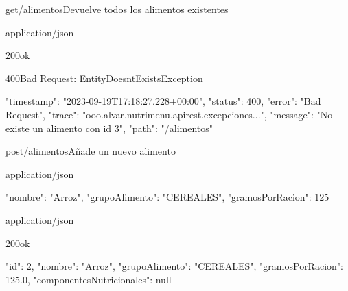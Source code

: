 \begin{apiRoute}{get}{/alimentos}{Devuelve todos los alimentos existentes}
	
	\begin{routeParameter}
	\end{routeParameter}
	
	\begin{routeResponse}{application/json}
		\begin{routeResponseItem}{200}{ok}
			\begin{routeResponseItemBody}
			\end{routeResponseItemBody}
		\end{routeResponseItem}
		\begin{routeResponseItem}{400}{Bad Request: EntityDoesntExistsException}
			\begin{routeResponseItemBody}
{
    "timestamp": "2023-09-19T17:18:27.228+00:00",
    "status": 400,
    "error": "Bad Request",
    "trace": "ooo.alvar.nutrimenu.apirest.excepciones...",
    "message": "No existe un alimento con id 3",
    "path": "/alimentos"
}
			\end{routeResponseItemBody}
		\end{routeResponseItem}
	\end{routeResponse}
	
\end{apiRoute}

\begin{apiRoute}{post}{/alimentos}{Añade un nuevo alimento}
	\begin{routeRequest}{application/json}
		\begin{routeRequestBody}
{
    "nombre": "Arroz",
    "grupoAlimento": "CEREALES",
    "gramosPorRacion": 125
}
		\end{routeRequestBody}
	\end{routeRequest}
	\begin{routeResponse}{application/json}
		\begin{routeResponseItem}{200}{ok}
			\begin{routeResponseItemBody}
{
    "id": 2,
    "nombre": "Arroz",
    "grupoAlimento": "CEREALES",
    "gramosPorRacion": 125.0,
    "componentesNutricionales": null
}
			\end{routeResponseItemBody}
		\end{routeResponseItem}
	\end{routeResponse}
\end{apiRoute}

